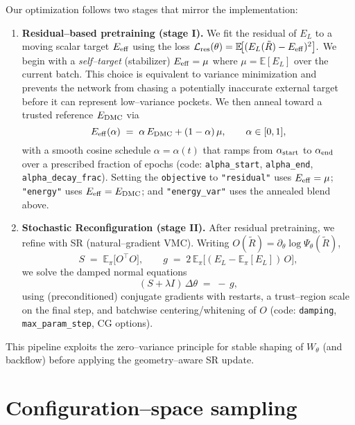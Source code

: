 Our optimization follows two stages that mirror the implementation:
\begin{enumerate}
  \item \textbf{Residual–based pretraining (stage I).} We fit the residual of $E_L$ to a moving scalar target $E_{\rm eff}$ using the loss
  \(
    \mathcal{L}_{\rm res}(\theta)=\mathbb{E}\!\big[(E_L(\tilde R)-E_{\rm eff})^2\big].
  \)
  We begin with a \emph{self–target} (stabilizer) $E_{\rm eff}=\mu$ where $\mu=\mathbb{E}[E_L]$ over the current batch. This choice is equivalent to variance minimization and prevents the network from chasing a potentially inaccurate external target before it can represent low–variance pockets. We then anneal toward a trusted reference $E_{\rm DMC}$ via
  \begin{equation}
    E_{\rm eff}(\alpha) \;=\; \alpha\,E_{\rm DMC} + (1-\alpha)\,\mu,
    \qquad \alpha \in [0,1],
  \end{equation}
  with a smooth cosine schedule $\alpha=\alpha(t)$ that ramps from $\alpha_{\rm start}$ to $\alpha_{\rm end}$ over a prescribed fraction of epochs (code: \texttt{alpha\_start}, \texttt{alpha\_end}, \texttt{alpha\_decay\_frac}). Setting the \texttt{objective} to \texttt{"residual"} uses $E_{\rm eff}=\mu$; \texttt{"energy"} uses $E_{\rm eff}=E_{\rm DMC}$; and \texttt{"energy\_var"} uses the annealed blend above.
  \item \textbf{Stochastic Reconfiguration (stage II).} After residual pretraining, we refine with SR (natural–gradient VMC). Writing $O(\tilde R)=\partial_\theta \log\Psi_\theta(\tilde R)$,
  \begin{equation}
    S \;=\; \mathbb{E}_\pi\!\big[O^\top O\big],\qquad
    g \;=\; 2\,\mathbb{E}_\pi\!\big[(E_L-\mathbb{E}_\pi[E_L])\,O\big],
  \end{equation}
  we solve the damped normal equations
  \begin{equation}
    (S+\lambda I)\,\Delta\theta \;=\; -\,g,
  \end{equation}
  using (preconditioned) conjugate gradients with restarts, a trust–region scale on the final step, and batchwise centering/whitening of $O$ (code: \texttt{damping}, \texttt{max\_param\_step}, CG options).
\end{enumerate}
This pipeline exploits the zero–variance principle for stable shaping of $W_\theta$ (and backflow) before applying the geometry–aware SR update.

\section{Configuration–space sampling}
\label{sec:sampling}

